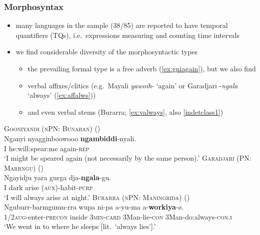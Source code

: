 \documentclass{article}
\makeatletter
\newcommand{\ofy}{/85} %
\makeatother
\begin{document}
\subsubsection{Morphosyntax}
\label{sec:tqmorph}
\begin{itemize}
\item many languages in the sample (38\ofy) are reported to have temporal quantifiers (TQs), i.e.\ expressions measuring and counting time intervals %
\item we find considerable diversity of the morphosyntactic types
  \begin{itemize}
  \item the prevailing formal type is a free adverb (\ref{ex:gniagain}), but we also find
  \item verbal affixes/clitics (e.g.\ Mayali \textit{yawoih}- `again' or Garadjari -\textit{ngala} `always' (\ref{ex:affalws}))
  \item and even verbal stems (Burarra; \ref{ex:valways}, also \ref{indetclass1})
  \end{itemize}
\end{itemize}

\begin{exe}
  \ex\label{ex:gniagain} \textsc{Gooniyandi (nPN: Bunaban)} (\citealt[462]{mcgregor90})\\
  \gll Nganyi nyagginboowooo \textbf{ngambiddi}-nyali.\\
  I he:will:spear:me again-\textsc{rep}\\
  \glt `I might be speared again (not necessarily by the same person).'
  \ex\label{ex:affalws} \textsc{Garadjari (PN: Marrngu)} (\citealt[42]{sands89})\\
  \gll Ngayidju yara gurga dja-\textbf{ngala}-gu.\\
  I dark arise (\textsc{aux})-habit-\textsc{purp}\\
  \glt `I will always arise at night.'
  \ex\label{ex:valways} \textsc{Burarra (nPN: Maningrida)} (\citealt[87]{green87})\\
  \gll Nguburr-barmgumu-rra wupa ni-pa a-yu-ma a-\textbf{workiya}-ø.\\
  \textsc{1/2aug}-enter-\textsc{precon} inside \textsc{3min-card}  3Man-lie-\textsc{con} 3Man-do:always-\textsc{con.i}\\
  \glt `We went in to where he sleeps [lit.\ `always lies'].'
\end{exe}
\end{document}
